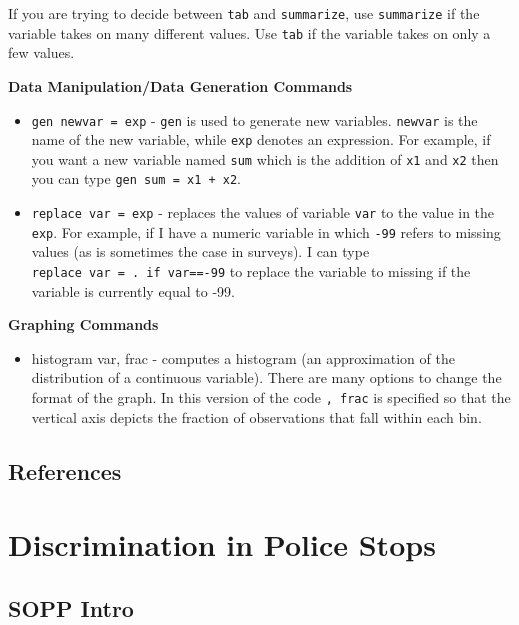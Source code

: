 \documentclass[
]{book}
\providecommand{\tightlist}{%
  \setlength{\itemsep}{0pt}\setlength{\parskip}{0pt}}
\begin{document}
If you are trying to decide between \texttt{tab} and \texttt{summarize}, use \texttt{summarize} if the variable takes on many different values. Use \texttt{tab} if the variable takes on only a few values.

\textbf{Data Manipulation/Data Generation Commands}

\begin{itemize}
\item
  \texttt{gen\ newvar\ =\ exp} - \texttt{gen} is used to generate new variables. \texttt{newvar} is the name of the new variable, while \texttt{exp} denotes an expression. For example, if you want a new variable named \texttt{sum} which is the addition of \texttt{x1} and \texttt{x2} then you can type \texttt{gen\ sum\ =\ x1\ +\ x2}.
\item
  \texttt{replace\ var\ =\ exp} - replaces the values of variable \texttt{var} to the value in the \texttt{exp}. For example, if I have a numeric variable in which \texttt{-99} refers to missing values (as is sometimes the case in surveys). I can type \texttt{replace\ var\ =\ .\ if\ var==-99} to replace the variable to missing if the variable is currently equal to -99.
\end{itemize}

\textbf{Graphing Commands}

\begin{itemize}
\tightlist
\item
  histogram var, frac - computes a histogram (an approximation of the distribution of a continuous variable). There are many options to change the format of the graph. In this version of the code \texttt{,\ frac} is specified so that the vertical axis depicts the fraction of observations that fall within each bin.
\end{itemize}

\section*{References}\label{references}

\chapter{Discrimination in Police Stops}\label{discrimination-in-police-stops}

\section{SOPP Intro}\label{sopp-intro}
\end{document}
